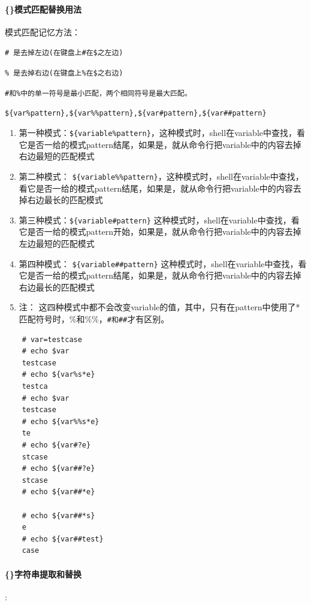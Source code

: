 \documentclass[UTF8,a4paper,12pt]{ctexbook}
\begin{document}
				\paragraph{\{\}模式匹配替换用法}模式匹配记忆方法：
				
					\verb|# 是去掉左边(在键盘上#在$之左边)|
					
					\verb|% 是去掉右边(在键盘上%在$之右边)|
					
					\verb|#和%中的单一符号是最小匹配，两个相同符号是最大匹配。|
					
					\verb|${var%pattern},${var%%pattern},${var#pattern},${var##pattern}|
				\begin{enumerate}
					\item 第一种模式：\verb|${variable%pattern}|，这种模式时，shell在variable中查找，看它是否一给的模式pattern结尾，如果是，就从命令行把variable中的内容去掉右边最短的匹配模式
					
					\item 第二种模式： \verb|${variable%%pattern}|，这种模式时，shell在variable中查找，看它是否一给的模式pattern结尾，如果是，就从命令行把variable中的内容去掉右边最长的匹配模式
					
					\item 第三种模式：\verb|${variable#pattern}| 这种模式时，shell在variable中查找，看它是否一给的模式pattern开始，如果是，就从命令行把variable中的内容去掉左边最短的匹配模式
					
					\item 第四种模式： \verb|${variable##pattern}| 这种模式时，shell在variable中查找，看它是否一给的模式pattern结尾，如果是，就从命令行把variable中的内容去掉右边最长的匹配模式
					
					\item 注： 这四种模式中都不会改变variable的值，其中，只有在pattern中使用了*匹配符号时，\%和\%\%，\verb|#和##|才有区别。
				\end{enumerate}
					
					\begin{lstlisting}
	# var=testcase  
	# echo $var  
	testcase  
	# echo ${var%s*e} 
	testca  
	# echo $var  
	testcase 
	# echo ${var%%s*e} 
	te
	# echo ${var#?e}  
	stcase
	# echo ${var##?e}  
	stcase
	# echo ${var##*e}  
	
	# echo ${var##*s}  
	e  
	# echo ${var##test}  
	case
					\end{lstlisting}
				
				\paragraph{\{\}字符串提取和替换}:
				
\end{document}
